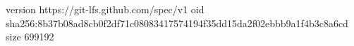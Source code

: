 version https://git-lfs.github.com/spec/v1
oid sha256:8b37b08ad8cb0f2df71c08083417574194f35dd15da2f02ebbb9a1f4b3c8a6cd
size 699192
